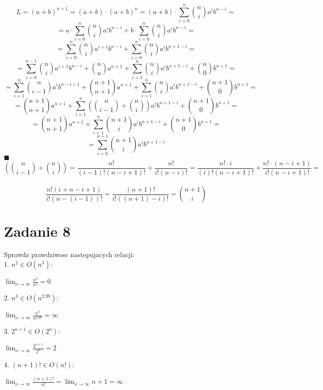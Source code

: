 \documentclass{article}
\renewcommand{\qedsymbol}{$\blacksquare$}
\newcommand{\xmark}{\ding{55}}
\begin{document}
$$ L = (a+b)^{n+1} = (a+b)\cdot(a+b)^n = (a+b)\cdot \sum_{i=0}^n {{n}\choose{i}} a^i b^{n-i} = $$
$$ = a\cdot \sum_{i=0}^n {{n}\choose{i}} a^i b^{n-i} + b\cdot \sum_{i=0}^n {{n}\choose{i}} a^i b^{n-i} = $$
$$ = \sum_{i=0}^n {{n}\choose{i}} a^{i+1} b^{n-i} + \sum_{i=0}^n {{n}\choose{i}} a^i b^{n+1-i} = $$
$$ = \sum_{i=0}^{n-1} {{n}\choose{i}} a^{i+1} b^{n-i} + {{n}\choose{n}}a^{n+1} + \sum_{i=1}^n {{n}\choose{i}} a^i b^{n+1-i} + {{n}\choose{0}}b^{n+1} = $$
$$ = \sum_{i=1}^{n} {{n}\choose{i-1}} a^i b^{n-i+1} + {{n+1}\choose{n+1}}a^{n+1} + \sum_{i=1}^n {{n}\choose{i}} a^i b^{n+1-i} + {{n+1}\choose{0}}b^{n+1} = $$
$$ = {{n+1}\choose{n+1}}a^{n+1} + \sum_{i=1}^n ({{n}\choose{i-1}} + {{n}\choose{i}}) a^i b^{n+1-i} + {{n+1}\choose{0}}b^{n+1} = $$
$$ = {{n+1}\choose{n+1}}a^{n+1} + \sum_{i=1}^n {{n+1}\choose{i}} a^i b^{n+1-i} + {{n+1}\choose{0}}b^{n+1} = $$
$$ = \sum_{i=0}^{n+1} {{n+1}\choose{i}} a^i b^{n+1-i}  $$\qedsymbol\\

$$({{n}\choose{i-1}} + {{n}\choose{i}}) = \frac{n!}{(i-1)!(n-i+1)!} + \frac{n!}{i!(n-i)!} = \frac{n!\cdot i}{(i)!(n-i+1)!} + \frac{n!\cdot (n-i+1)}{i!(n-i+1)!} = $$\\
$$\frac{n!(i+n-i+1)}{i!(n-(i-1))!} = \frac{(n+1)!}{i!((n+1)-i)!} = {{n+1}\choose{i}}$$


\newpage
\section{Zadanie 8}
Sprawdz prawdziwosc nastepujacych relacji:\\

1. $n^2 \in O(n^3)$: \\
\begin{center}
$ \lim_{n \to \infty} \frac{n^2}{n^3} = 0$ \checkmark
\end{center}

2. $ n^3 \in O(n^{2.99})$:\\
\begin{center}
$ \lim_{n \to \infty} \frac{n^3}{n^{2.99}} = \infty$ \xmark
\end{center}


3. $ 2^{n+1} \in O(2^n)$:\\
\begin{center}
$ \lim_{n \to \infty} \frac{2^{n+1}}{2^n} = 2$ \checkmark
\end{center}

4. $(n+1)! \in O(n!)$:\\
\begin{center}
$ \lim_{n \to \infty} \frac{(n+1)!}{n!} = \lim_{x \to \infty} n+1 = \infty$ \xmark
\end{center}
\end{document}
